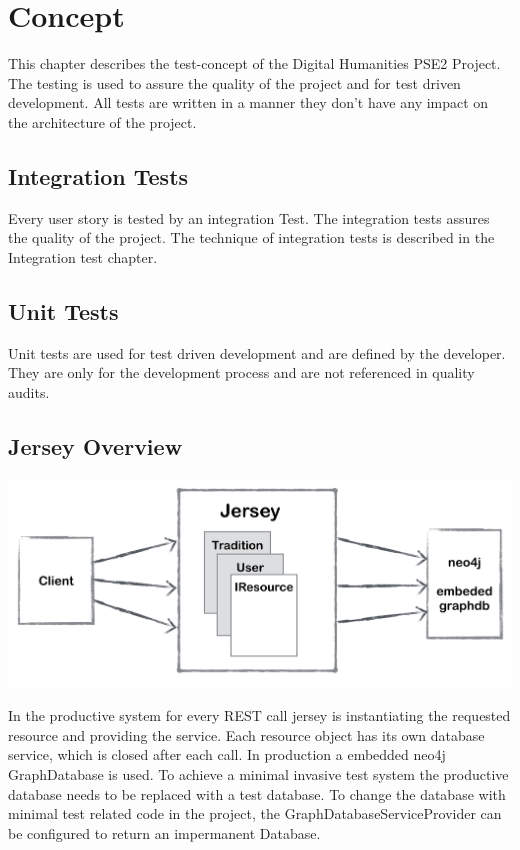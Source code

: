 \documentclass[11pt,fleqn,openany]{book} %
\begin{document}

\chapter{Concept}
This chapter describes the test-concept of the Digital Humanities PSE2 Project. The testing is used to assure the quality of the project and for test driven development. All tests are written in a manner they don't have any impact on the architecture of the project. 

\section*{Integration Tests}
Every user story is tested by an integration Test. The integration tests assures the quality of the project. The technique of integration tests is described in the Integration test chapter. 

\section*{Unit Tests}
Unit tests are used for test driven development and are defined by the developer. They are only for the development process and are not referenced in quality audits.

\newpage

\section*{Jersey Overview} 

\begin{center}
\includegraphics[scale=.40]{Pictures/jerseyoverview.png} 
\end{center}

In the productive system for every REST call jersey is instantiating the requested resource and providing the service. Each resource object has its own database service, which is closed after each call. In production a embedded neo4j GraphDatabase is used. To achieve a minimal invasive test system the productive database needs to be replaced with a test database. To change the database with minimal test related code in the project, the GraphDatabaseServiceProvider can be configured to return an impermanent Database.
\end{document}
